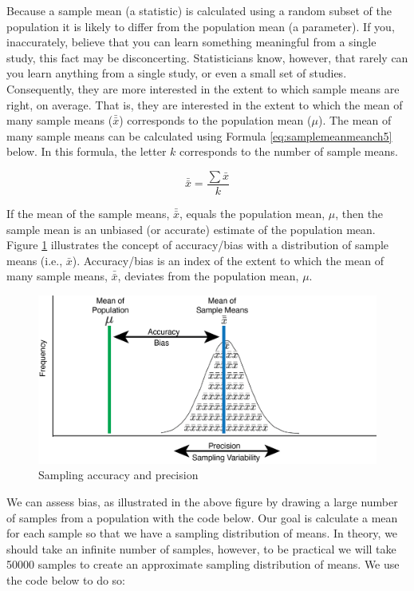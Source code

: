 \documentclass[
]{krantz}
\begin{document}
Because a sample mean (a statistic) is calculated using a random subset of the population it is likely to differ from the population mean (a parameter). If you, inaccurately, believe that you can learn something meaningful from a single study, this fact may be disconcerting. Statisticians know, however, that rarely can you learn anything from a single study, or even a small set of studies. Consequently, they are more interested in the extent to which sample means are right, on average. That is, they are interested in the extent to which the mean of many sample means (\(\bar{\bar{x}}\)) corresponds to the population mean (\(\mu\)). The mean of many sample means can be calculated using Formula \eqref{eq:samplemeanmeanch5} below. In this formula, the letter \(k\) corresponds to the number of sample means.

\begin{equation} 
\bar{\bar{x}} = \frac{\sum{\bar{x}}}{k}
      \label{eq:samplemeanmeanch5}
\end{equation}

If the mean of the sample means, \(\bar{\bar{x}}\), equals the population mean, \(\mu\), then the sample mean is an unbiased (or accurate) estimate of the population mean. Figure \ref{fig:showbias} illustrates the concept of accuracy/bias with a distribution of sample means (i.e., \(\bar{x}\)). Accuracy/bias is an index of the extent to which the mean of many sample means, \(\bar{\bar{x}}\), deviates from the population mean, \(\mu\).

\begin{figure}
\includegraphics[width=0.8\linewidth]{ch_samples/images/sampling_accuracy} \caption{Sampling accuracy and precision}\label{fig:showbias}
\end{figure}

We can assess bias, as illustrated in the above figure by drawing a large number of samples from a population with the code below. Our goal is calculate a mean for each sample so that we have a sampling distribution of means. In theory, we should take an infinite number of samples, however, to be practical we will take 50000 samples to create an approximate sampling distribution of means. We use the code below to do so:
\end{document}
